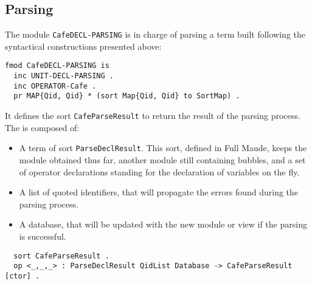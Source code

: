 \subsection{Parsing\label{subsec:parsing}}

The module \verb"CafeDECL-PARSING" is in charge of parsing a term built following
the syntactical constructions presented above:

{\codesize
\begin{verbatim}
fmod CafeDECL-PARSING is
  inc UNIT-DECL-PARSING .
  inc OPERATOR-Cafe .
  pr MAP{Qid, Qid} * (sort Map{Qid, Qid} to SortMap) .
\end{verbatim}
}

It defines the sort \verb"CafeParseResult" to return the result of the parsing process.
The is composed of:
\begin{itemize}
\item
A term of sort \verb"ParseDeclResult". This sort, defined in Full Maude, keeps
the module obtained thus far, another module still containing bubbles, and a set of
operator declarations standing for the declaration of variables on the fly.

\item
A list of quoted identifiers, that will propagate the errors found during the
parsing process.

\item
A database, that will be updated with the new module or view if the parsing is
successful.
\end{itemize}

{\codesize
\begin{verbatim}
  sort CafeParseResult .
  op <_,_,_> : ParseDeclResult QidList Database -> CafeParseResult [ctor] .
\end{verbatim}
}

